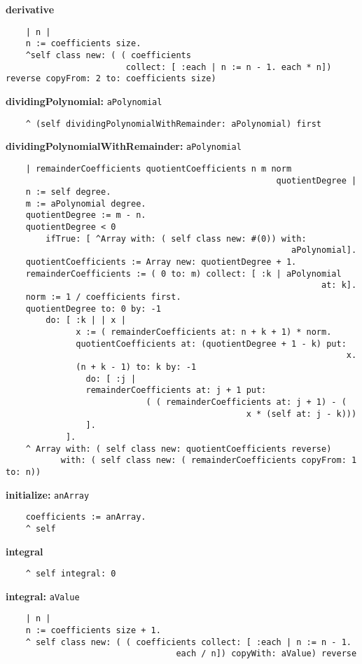 {\bf derivative}
\begin{verbatim}
    | n |
    n := coefficients size.
    ^self class new: ( ( coefficients 
    					collect: [ :each | n := n - 1. each * n]) reverse copyFrom: 2 to: coefficients size)
\end{verbatim}
{\bf dividingPolynomial:} {\tt aPolynomial}
\begin{verbatim}
    ^ (self dividingPolynomialWithRemainder: aPolynomial) first
\end{verbatim}
{\bf dividingPolynomialWithRemainder:} {\tt aPolynomial}
\begin{verbatim}
    | remainderCoefficients quotientCoefficients n m norm 
                                                      quotientDegree |
    n := self degree.
    m := aPolynomial degree.
    quotientDegree := m - n.
    quotientDegree < 0
        ifTrue: [ ^Array with: ( self class new: #(0)) with: 
                                                         aPolynomial].
    quotientCoefficients := Array new: quotientDegree + 1.
    remainderCoefficients := ( 0 to: m) collect: [ :k | aPolynomial 
                                                               at: k].
    norm := 1 / coefficients first.
    quotientDegree to: 0 by: -1
        do: [ :k | | x |
              x := ( remainderCoefficients at: n + k + 1) * norm.
              quotientCoefficients at: (quotientDegree + 1 - k) put: 
                                                                    x.
              (n + k - 1) to: k by: -1
                do: [ :j | 
                remainderCoefficients at: j + 1 put: 
                            ( ( remainderCoefficients at: j + 1) - ( 
                                                x * (self at: j - k)))
                ].
            ].
    ^ Array with: ( self class new: quotientCoefficients reverse)
           with: ( self class new: ( remainderCoefficients copyFrom: 1 to: n))
\end{verbatim}
{\bf initialize:} {\tt anArray}
\begin{verbatim}
    coefficients := anArray.
    ^ self
\end{verbatim}
{\bf integral}
\begin{verbatim}
    ^ self integral: 0
\end{verbatim}
{\bf integral:} {\tt aValue}
\begin{verbatim}
    | n |
    n := coefficients size + 1.
    ^ self class new: ( ( coefficients collect: [ :each | n := n - 1. 
                                  each / n]) copyWith: aValue) reverse
\end{verbatim}

